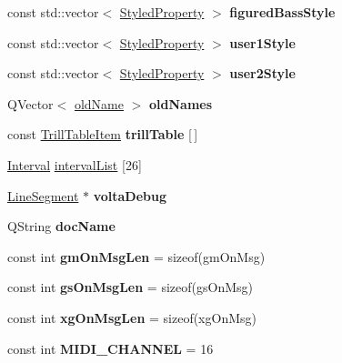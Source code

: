 \begin{DoxyCompactItemize}
\item 
const std\+::vector$<$ \hyperlink{struct_ms_1_1_styled_property}{Styled\+Property} $>$ {\bfseries figured\+Bass\+Style}
\item 
const std\+::vector$<$ \hyperlink{struct_ms_1_1_styled_property}{Styled\+Property} $>$ {\bfseries user1\+Style}
\item 
const std\+::vector$<$ \hyperlink{struct_ms_1_1_styled_property}{Styled\+Property} $>$ {\bfseries user2\+Style}
\item 
\mbox{\label{namespace_ms_a2efc69b03acd6970c89c7e37acf0af4e}} 
Q\+Vector$<$ \hyperlink{struct_ms_1_1old_name}{old\+Name} $>$ {\bfseries old\+Names}
\item 
const \hyperlink{struct_ms_1_1_trill_table_item}{Trill\+Table\+Item} {\bfseries trill\+Table} \mbox{[}$\,$\mbox{]}
\item 
\hyperlink{struct_ms_1_1_interval}{Interval} \hyperlink{namespace_ms_a2619f810ea1ef33b38bc051c5b723ae0}{interval\+List} \mbox{[}26\mbox{]}
\item 
\mbox{\label{namespace_ms_a4e29c43040fc996b9cc299fa5774a398}} 
\hyperlink{class_ms_1_1_line_segment}{Line\+Segment} $\ast$ {\bfseries volta\+Debug}
\item 
\mbox{\label{namespace_ms_a8bcdc7fa7771b67a64c44c17bfef16bf}} 
Q\+String {\bfseries doc\+Name}
\item 
\mbox{\label{namespace_ms_a8c5b80fd72a185398c960448b52ddfa6}} 
const int {\bfseries gm\+On\+Msg\+Len} = sizeof(gm\+On\+Msg)
\item 
\mbox{\label{namespace_ms_ab53d04bfaf06a7de7e44cced8a1b36af}} 
const int {\bfseries gs\+On\+Msg\+Len} = sizeof(gs\+On\+Msg)
\item 
\mbox{\label{namespace_ms_a7c89b5fc39e95fd358da3fb74249ab05}} 
const int {\bfseries xg\+On\+Msg\+Len} = sizeof(xg\+On\+Msg)
\item 
\mbox{\label{namespace_ms_a4523fc5863c2eace4649b5ebcb970185}} 
const int {\bfseries M\+I\+D\+I\+\_\+\+C\+H\+A\+N\+N\+EL} = 16
\item 
\mbox{\label{namespace_ms_aa674a3fe0cd0f35c6594fa32033f5f8e}} 

\end{DoxyCompactItemize}
